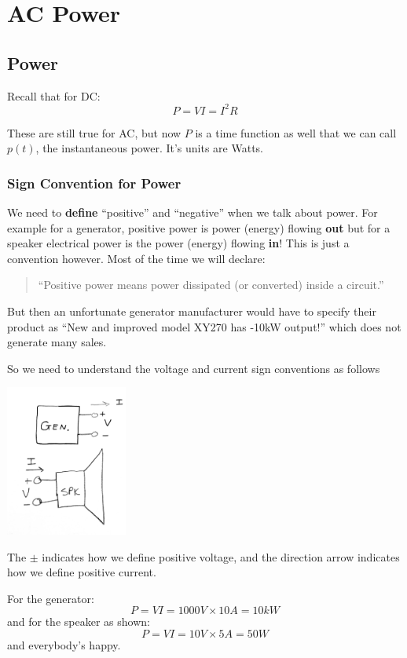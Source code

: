 
\chapter{AC Power}
\section{Power}

Recall that for DC:
\[
P = VI = I^2 R
\]

These are still true for AC, but now $P$ is a time function as well
that we can call $p(t)$, the instantaneous power.  It's units
are  Watts.

\subsection{Sign Convention for Power}

We need to {\bf define} ``positive'' and ``negative'' when we talk about
power. For example for a generator, positive power is power (energy) flowing
{\bf out} but for a speaker electrical power is the power (energy) flowing
{\bf in}!     This is just a convention however.  Most of the time we will declare:

\begin{quotation} ``Positive power means power dissipated (or converted) inside
a circuit.'' \end{quotation}

But then an unfortunate generator manufacturer would have to specify their
product as ``New
and improved model XY270 has -10kW output!'' which does not generate many sales.

So we need to understand the voltage and current sign conventions as follows

\includegraphics[width=0.3\textwidth]{figsChapt03/IE47318.png}

The $\pm$ indicates how we define positive voltage, and the direction arrow indicates
how we define positive current.

For the generator:
\[
P = VI = 1000V\times 10A = 10kW
\]
and for the speaker as shown:
\[
P = VI = 10V\times5A  =50W
\]
and everybody's happy.







